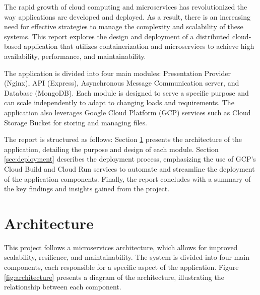 \documentclass[a4paper,fleqn]{cas-dc}
\begin{document}
The rapid growth of cloud computing and microservices has revolutionized the way applications are developed and deployed. As a result, there is an increasing need for effective strategies to manage the complexity and scalability of these systems. This report explores the design and deployment of a distributed cloud-based application that utilizes containerization and microservices to achieve high availability, performance, and maintainability.

The application is divided into four main modules: Presentation Provider (Nginx), API (Express), Asynchronous Message Communication server, and Database (MongoDB). Each module is designed to serve a specific purpose and can scale independently to adapt to changing loads and requirements. The application also leverages Google Cloud Platform (GCP) services such as Cloud Storage Bucket for storing and managing files.

The report is structured as follows: Section \ref{sec:architecture} presents the architecture of the application, detailing the purpose and design of each module. Section \ref{sec:deployment} describes the deployment process, emphasizing the use of GCP's Cloud Build and Cloud Run services to automate and streamline the deployment of the application components. Finally, the report concludes with a summary of the key findings and insights gained from the project.

\section{Architecture}\label{sec:architecture}

This project follows a microservices architecture, which allows for improved scalability, resilience, and maintainability. The system is divided into four main components, each responsible for a specific aspect of the application. Figure \ref{fig:architecture} presents a diagram of the architecture, illustrating the relationship between each component.
\end{document}
